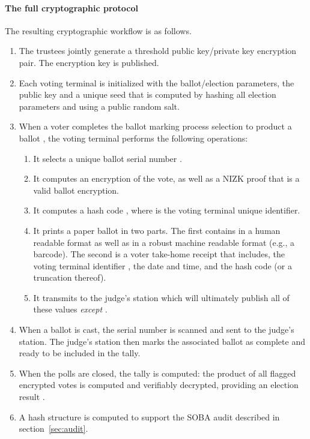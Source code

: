 \documentclass[letterpaper, 10pt, twocolumn]{article}
\begin{document}
\paragraph{The full cryptographic protocol}
\label{sec:full-protocol}
The resulting cryptographic workflow is as follows. 
\begin{enumerate}
\item The trustees jointly generate a threshold public key/private key
  encryption pair. The encryption key  is published.
\item Each voting terminal is initialized with the ballot/election
  parameters, the public key  and a unique seed  that is
  computed by hashing all election parameters and using a public
  random salt.
\item When a voter completes the ballot marking process selection
  to product a ballot , the voting terminal performs the following operations: 
  \begin{enumerate}
  \item It selects a unique ballot serial number .
  \item It computes an encryption  of the vote, as
    well as a NIZK proof  that  is a valid ballot encryption.
  \item It computes a hash code ,
    where  is the voting terminal unique identifier.
  \item It prints a paper ballot in two parts. The first contains 
    in a human readable format as well as  in a robust machine
    readable format (e.g., a barcode). The second is a voter take-home
    receipt that includes, the voting terminal identifier , the date
    and time, and the hash code  (or a truncation thereof).
  \item It transmits  to
    the judge's station which will ultimately publish all of these values
    {\em except\/} .
  \end{enumerate}
\item When a ballot is cast, the serial number  is scanned and sent
  to the judge's station.  The judge's station then marks the associated ballot
  as complete and ready to be included in the tally.
\item When the polls are closed, the tally is computed: the product
   of all flagged encrypted votes is computed and verifiably
  decrypted, providing an election result .
\item A hash structure is computed to support the SOBA audit described in
  section~\ref{sec:audit}.
\end{enumerate}
\end{document}
